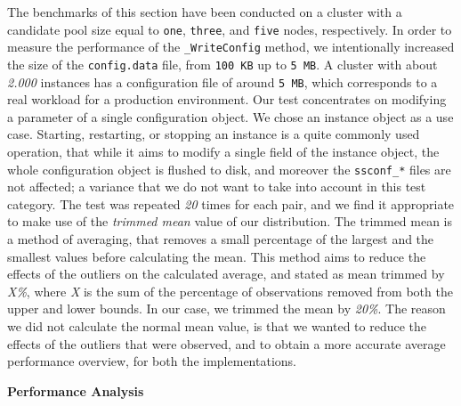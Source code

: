 The benchmarks of this section have been conducted on a cluster with a candidate
pool size equal to \texttt{one}, \texttt{three}, and \texttt{five} nodes,
respectively. In order to measure the performance of the \texttt{\_WriteConfig}
method, we intentionally increased the size of the \texttt{config.data} file,
from \texttt{100 KB} up to \texttt{5 MB}. A cluster with about \emph{2.000}
instances has a configuration file of around \texttt{5 MB}, which corresponds to
a real workload for a production environment. Our test concentrates on modifying
a parameter of a single configuration object. We chose an instance object as a
use case. Starting, restarting, or stopping an instance is a quite commonly used
operation, that while it aims to modify a single field of the instance object,
the whole configuration object is flushed to disk, and moreover the
\texttt{ssconf\_*} files are not affected; a variance that we do not want
to take into account in this test category. The test was repeated \emph{20}
times for each pair, and we find it appropriate to make use of the
\emph{trimmed mean} value of our distribution. The trimmed mean is a method of
averaging, that removes a small percentage of the largest and the smallest
values before calculating the mean. This method aims to reduce the effects of
the outliers on the calculated average, and stated as mean trimmed by
\emph{X\%}, where \emph{X} is the sum of the percentage of observations
removed from both the upper and lower bounds. In our case, we trimmed the mean
by \emph{20\%}. The reason we did not calculate the normal mean value, is that
we wanted to reduce the effects of the outliers that were observed, and to
obtain a more accurate average performance overview, for both the
implementations.

\bigskip
\textbf{Performance Analysis}

